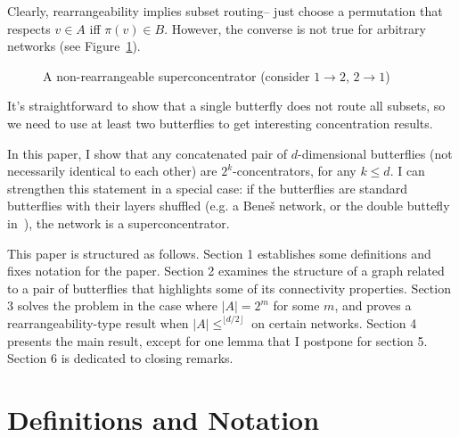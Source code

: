 \documentclass[12pt]{article}
\begin{document}
Clearly, rearrangeability implies subset routing-- just choose a permutation
that respects $v\in A$ iff $\pi(v)\in B$.  However, the converse is not true
for arbitrary networks (see Figure~\ref{subset counterexample}).
\begin{figure}[ht]
\centerline{ \hspace{.2in}  }
\caption{A non-rearrangeable superconcentrator (consider 
$1\rightarrow 2$, $2\rightarrow 1$) }
\label{subset counterexample}
\end{figure}
It's straightforward to show that a single butterfly does not route all 
subsets, so we need to use at least two butterflies to get interesting 
concentration results.

In this paper, I show that any concatenated pair of $d$-dimensional 
butterflies 
(not necessarily identical to each other) are $2^{k}$-concentrators, 
for any $k\leq d$.  I can strengthen this statement in 
a special case:  if the butterflies
are standard butterflies with their layers shuffled (e.g. a Bene\v{s} 
network, or the double buttefly in~\cite{Cam}), the network
is a superconcentrator.

	This paper is structured as follows.  Section 1 establishes some 
definitions and fixes notation for the paper.  Section 2 examines the 
structure of a graph related to a pair of butterflies that highlights
some of its connectivity properties.  Section 3 solves the problem
in the case where $|A|=2^{m}$ for some $m$, and proves a 
rearrangeability-type result when $|A|\leq ^{\lfloor d/2 \rfloor}$
on certain networks.
Section 4 presents the main result, except for one lemma 
that I postpone for section 5.  Section 6 is dedicated to closing remarks.

\section{Definitions and Notation}
\end{document}
